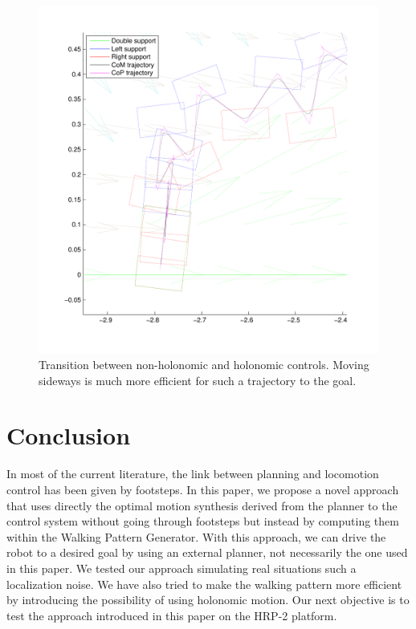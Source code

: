 \begin{figure}[ht]
\centering
\includegraphics[scale=0.35]{figures/steps11zoom.pdf}
\caption{Transition between non-holonomic and holonomic controls. Moving sideways is much more efficient for such a trajectory to the goal.}
\label{fig:steps11zoom}
\end{figure}


\section{Conclusion}
\label{sec:conclusion}

In most of the current literature, the link between planning and locomotion control has been given by footsteps. In this paper, we propose a novel approach that uses directly the optimal motion synthesis derived from the planner to the control system without going through footsteps but instead by computing them within the Walking Pattern Generator. With this approach, we can drive the robot to a desired goal by using an external planner, not necessarily the one used in this paper. We tested our approach simulating real situations such a localization noise. We have also tried to make the walking pattern more efficient by introducing the possibility of using holonomic motion. Our next objective is to test the approach introduced in this paper on the HRP-2 platform.

